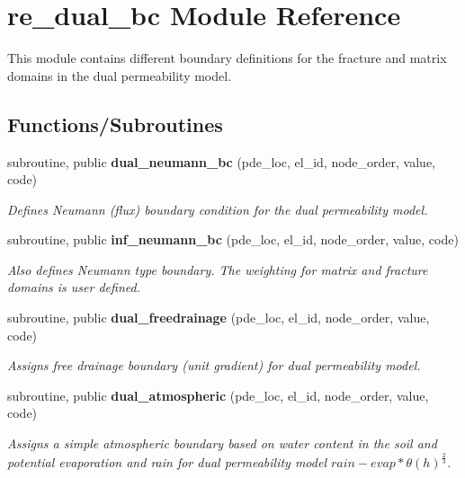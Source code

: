 \section{re\+\_\+dual\+\_\+bc Module Reference}
\label{namespacere__dual__bc}


This module contains different boundary definitions for the fracture and matrix domains in the dual permeability model.  


\subsection*{Functions/\+Subroutines}
\begin{DoxyCompactItemize}
\item 
subroutine, public {\bf dual\+\_\+neumann\+\_\+bc} (pde\+\_\+loc, el\+\_\+id, node\+\_\+order, value, code)
\begin{DoxyCompactList}\small\item\em Defines Neumann (flux) boundary condition for the dual permeability model. \end{DoxyCompactList}\item 
subroutine, public {\bf inf\+\_\+neumann\+\_\+bc} (pde\+\_\+loc, el\+\_\+id, node\+\_\+order, value, code)
\begin{DoxyCompactList}\small\item\em Also defines Neumann type boundary. The weighting for matrix and fracture domains is user defined. \end{DoxyCompactList}\item 
subroutine, public {\bf dual\+\_\+freedrainage} (pde\+\_\+loc, el\+\_\+id, node\+\_\+order, value, code)
\begin{DoxyCompactList}\small\item\em Assigns free drainage boundary (unit gradient) for dual permeability model. \end{DoxyCompactList}\item 
subroutine, public {\bf dual\+\_\+atmospheric} (pde\+\_\+loc, el\+\_\+id, node\+\_\+order, value, code)
\begin{DoxyCompactList}\small\item\em Assigns a simple atmospheric boundary based on water content in the soil and potential evaporation and rain for dual permeability model $rain - evap*\theta(h)^{\frac{2}{3}}$. \end{DoxyCompactList}\end{DoxyCompactItemize}


